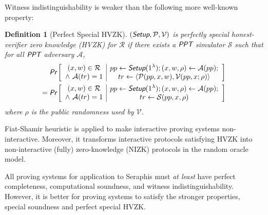 \documentclass{article}
\theoremstyle{plain}
\newtheorem{definition}{Definition}[section]
\theoremstyle{remark}
\begin{document}
Witness indistinguishability is weaker \cite{groth} than the following more well-known property:
\begin{definition}[Perfect Special HVZK]
$(\emph{\textsf{Setup}}, \mathcal{P}, \mathcal{V})$ is perfectly special honest-verifier zero knowledge (HVZK) for $\mathcal{R}$ if there exists a $\emph{\textsf{PPT}}$ simulator $\mathcal{S}$ such that for all $\emph{\textsf{PPT}}$ adversary $\mathcal{A}$,
\begin{align*}
\emph{\textsf{Pr}}\left[
\begin{array}{c|c}
    \begin{gathered}
        (x,w)\in\mathcal{R}\\
        \wedge\ \mathcal{A}(tr) = 1
    \end{gathered}
    &
    \begin{gathered}
        pp\leftarrow\emph{\textsf{Setup}}(1^{\lambda}); (x, w, \rho)\leftarrow\mathcal{A}(pp); \\
        tr\leftarrow\langle\mathcal{P}(pp,x,w), \mathcal{V}(pp,x; \rho)\rangle
    \end{gathered}
\end{array}
\right] \\
=\emph{\textsf{Pr}}\left[
\begin{array}{c|c}
    \begin{gathered}
        (x,w)\in\mathcal{R}\\
        \wedge\ \mathcal{A}(tr) = 1
    \end{gathered}
    &
    \begin{gathered}
        pp\leftarrow\emph{\textsf{Setup}}(1^{\lambda}); (x, w, \rho)\leftarrow\mathcal{A}(pp); \\
        tr\leftarrow\mathcal{S}(pp, x, \rho)
    \end{gathered}
\end{array}
\right]
\end{align*}
where $\rho$ is the public randomness used by $\mathcal{V}$.
\end{definition}

Fiat-Shamir heuristic \cite{fiat-shamir} is applied to make interactive proving systems non-interactive. Moreover, it transforms interactive protocols satisfying HVZK into non-interactive (fully) zero-knowledge (NIZK) protocols in the random oracle model.

All proving systems for application to Seraphis must \textit{at least} have perfect completeness,  computational soundness, and witness indistinguishability. However, it is better for proving systems to satisfy the stronger properties, special soundness and perfect special HVZK.
\end{document}

